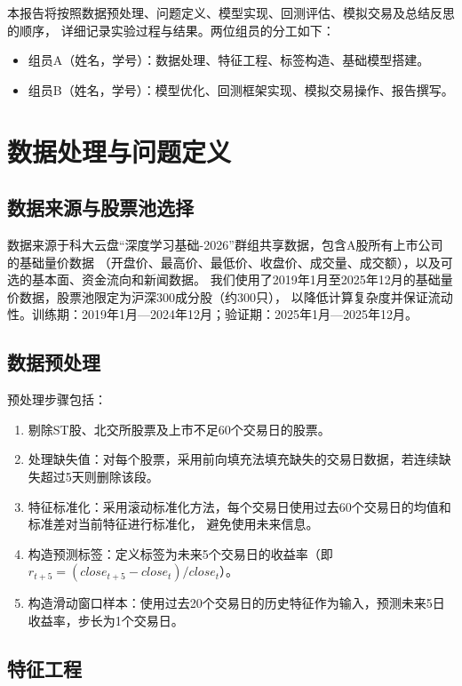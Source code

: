 \documentclass[12pt]{article} %
\begin{document}
本报告将按照数据预处理、问题定义、模型实现、回测评估、模拟交易及总结反思的顺序，
详细记录实验过程与结果。两位组员的分工如下：
\begin{itemize}
    \item 组员A（姓名，学号）：数据处理、特征工程、标签构造、基础模型搭建。
    \item 组员B（姓名，学号）：模型优化、回测框架实现、模拟交易操作、报告撰写。
\end{itemize}

\section{数据处理与问题定义}

\subsection{数据来源与股票池选择}

数据来源于科大云盘“深度学习基础-2026”群组共享数据，包含A股所有上市公司的基础量价数据
（开盘价、最高价、最低价、收盘价、成交量、成交额），以及可选的基本面、资金流向和新闻数据。
我们使用了2019年1月至2025年12月的基础量价数据，股票池限定为沪深300成分股（约300只），
以降低计算复杂度并保证流动性。训练期：2019年1月—2024年12月；验证期：2025年1月—2025年12月。

\subsection{数据预处理}

预处理步骤包括：
\begin{enumerate}
    \item 剔除ST股、北交所股票及上市不足60个交易日的股票。
    \item 处理缺失值：对每个股票，采用前向填充法填充缺失的交易日数据，若连续缺失超过5天则删除该段。
    \item 特征标准化：采用滚动标准化方法，每个交易日使用过去60个交易日的均值和标准差对当前特征进行标准化，
        避免使用未来信息。
    \item 构造预测标签：定义标签为未来5个交易日的收益率（即 $r_{t+5} = (close_{t+5} - close_t)/close_t$）。
    \item 构造滑动窗口样本：使用过去20个交易日的历史特征作为输入，预测未来5日收益率，步长为1个交易日。
\end{enumerate}

\subsection{特征工程}
\end{document}
